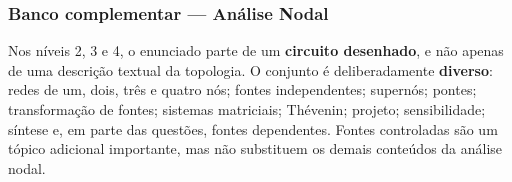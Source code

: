 
\subsubsection*{Banco complementar --- Análise Nodal}

\begin{atencao}
Nos níveis 2, 3 e 4, o enunciado parte de um \textbf{circuito desenhado}, e não
apenas de uma descrição textual da topologia. O conjunto é deliberadamente
\textbf{diverso}: redes de um, dois, três e quatro nós; fontes independentes;
supernós; pontes; transformação de fontes; sistemas matriciais; Thévenin;
projeto; sensibilidade; síntese e, em parte das questões, fontes dependentes.
Fontes controladas são um tópico adicional importante, mas não substituem os
demais conteúdos da análise nodal.
\end{atencao}




\begingroup
\newcount\fvNodalNTwoCircuitCount
{}
\let\fvCircuitoNodalNtwoOriginal\circuitoq
\renewcommand{\circuitoq}[1]{%
  \global\advance\fvNodalNTwoCircuitCount by 1\relax
  \ifcase\fvNodalNTwoCircuitCount
    \fvCircuitoNodalNtwoOriginal{#1}%
  \or \fvCircuitoNodalNtwoOriginal{\fvNodalNtwoOne}%
  \or \fvCircuitoNodalNtwoOriginal{\fvNodalNtwoTwo}%
  \or \fvCircuitoNodalNtwoOriginal{\fvNodalNtwoThree}%
  \or \fvCircuitoNodalNtwoOriginal{\fvNodalNtwoFour}%
  \or \fvCircuitoNodalNtwoOriginal{\fvNodalQSevenThreeFiveRevisada}%
  \or \fvCircuitoNodalNtwoOriginal{\fvNodalNtwoSix}%
  \or \fvCircuitoNodalNtwoOriginal{\fvNodalNtwoSeven}%
  \or \fvCircuitoNodalNtwoOriginal{\fvNodalNtwoEightParaleloRevisada}%
  \or \fvCircuitoNodalNtwoOriginal{\fvNodalQSevenThreeNineRevisada}%
  \or \fvCircuitoNodalNtwoOriginal{\fvNodalNtwoTen}%
  \or \fvCircuitoNodalNtwoOriginal{\fvNodalNtwoEleven}%
  \or \fvCircuitoNodalNtwoOriginal{\fvNodalQSevenFourTwoRevisada}%
  \or \fvCircuitoNodalNtwoOriginal{\fvNodalNtwoThirteen}%
  \else
    \fvCircuitoNodalNtwoOriginal{#1}%
  \fi}

\endgroup

